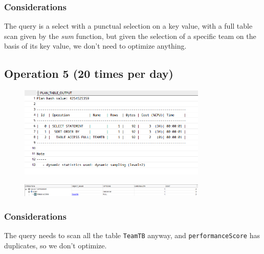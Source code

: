\subsubsection*{Considerations}
The query is a select with a punctual selection on a key value, with a full table scan given by the \textit{sum} function, but given the selection of a specific team on the basis of its key value, we don't need to optimize anything.

\subsection*{Operation 5 (20 times per day)}
\begin{figure}[H]
    \centering
    \includegraphics[width=0.8\textwidth]{img/phys/op5-1.png}
\end{figure}
\begin{figure}[H]
    \centering
    \includegraphics[width=0.8\textwidth]{img/phys/op5-2.png}
\end{figure}
\subsubsection*{Considerations}
The query needs to scan all the table \texttt{TeamTB} anyway, and \texttt{performanceScore} has duplicates, so we don't optimize.
